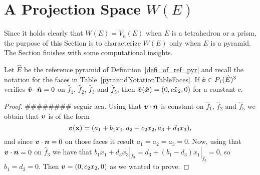 \section{A Projection Space $W(E)$}
Since it holds clearly that $W(E)=V_h(E)$ when $E$ is a tetrahedron or a prism,
the purpose of this Section is to characterize $W(E)$ only when $E$ is a pyramid.
The Section finishes with some computational insights. 
\begin{lemma}\label{L3}
Let $\hat E$ be the reference pyramid 
of Definition~\ref{defi_of_ref_pyr} and recall the notation for the faces
in Table~\ref{pyramidNotationTableFaces}.
If $\hat{\boldsymbol{v}}\in P_1(\hat E)^3$ verifies $\hat{\boldsymbol{v}} \cdot \hat{\boldsymbol{n}} =0$ on
$\hat f_1$, $\hat f_2$, $\hat f_3$ and
$\hat f_5$, then $\hat{\boldsymbol{v}}(\hat{\boldsymbol{x}})=(0,c\hat x_2,0)$ for a constant $c$.
\end{lemma}
\begin{proof}{\color{Orange}\#\#\#\#\#\#\#\# seguir aca.}
Using that $\boldsymbol{v}\cdot\boldsymbol{n}$ is constant on $\hat f_1$, $\hat f_2$ and
$\hat f_5$ we obtain that $\boldsymbol{v}$ is of the form
\[
\boldsymbol{v}({\bf x}) = (a_1+b_1x_1, a_2+c_2x_2,a_3+d_3x_3),
\]
and since $\boldsymbol{v}\cdot\boldsymbol{n}=0$ on those faces it result
$a_1=a_2=a_3=0$. Now, using that $\boldsymbol{v}\cdot\boldsymbol{n}=0$ on
$\hat f_3$  we have that $b_1x_1+d_3x_3|_{\hat f_3}=d_3+(b_1-d_3)x_1|_{\hat f_3}=0$,
so $b_1=d_3=0$. Then $\boldsymbol{v}=(0,c_2x_2,0)$ as we wanted to prove.
\end{proof}

